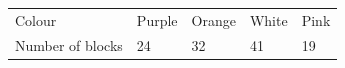 \begin{enumerate}[noitemsep, label=\textbf{\arabic*}. ]
{\begin{tabular}[t]{|l|l|l|l|l|}
        Colour &
        Purple &
        Orange &
        White &
        Pink%
     \tabularnewline\cline{1-1}\cline{2-2}\cline{3-3}\cline{4-4}\cline{5-5}
        Number of
blocks &
        24 &
        32 &
        41 &
        19%
     \tabularnewline\cline{1-1}\cline{2-2}\cline{3-3}\cline{4-4}\cline{5-5}
    \end{tabular}} %
\end{enumerate}
